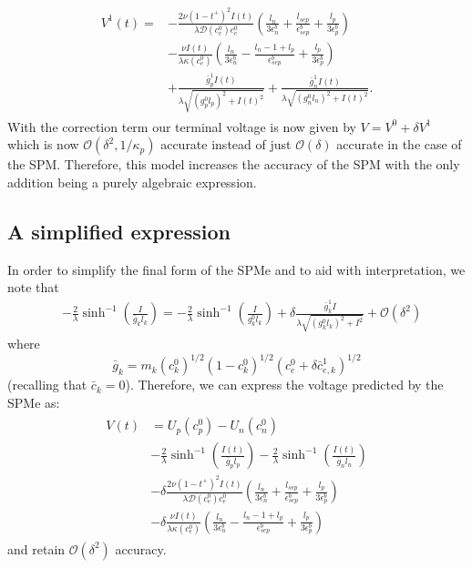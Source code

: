 \documentclass[preprint]{elsarticle}
\begin{document}
\begin{align}\label{eqn:voltageCorrection}
\begin{split} 
V^1(t) = &-\frac{2 \nu (1-t^+)^2I(t)}{\lambda \mathcal{D}(c_e^0)c_e^0}\left( \frac{l_n}{3 \epsilon_n^b} + \frac{l_{sep}}{\epsilon_{sep}^b} + \frac{l_p}{3\epsilon_p^b} \right) \\ 
    & - \frac{\nu I(t)}{\lambda \kappa(c_e^0)} \left(\frac{l_n}{3\epsilon_n^b} - \frac{l_n - 1 + l_p}{\epsilon_{sep}^b} + \frac{l_p}{3\epsilon_p^b} \right) \\
    &+ \frac{\bar{g}_p^1 I(t) }{\lambda \sqrt{(g_p^0l_p)^2+I(t)^2}} + \frac{\bar{g}_n^1 I(t) }{\lambda \sqrt{(g_n^0l_n)^2+I(t)^2}}.  
\end{split}
\end{align} 
With the correction term our terminal voltage is now given by $V=V^0+\delta V^1$ which is now $\mathcal{O}(\delta^2,1/\kappa_p)$ accurate instead of just $\mathcal{O}(\delta)$ accurate in the case of the SPM. Therefore, this model increases the accuracy of the SPM with the only addition being a purely algebraic expression. 

\subsection{A simplified expression} 
In order to simplify the final form of the SPMe and to aid with interpretation, we note that
\begin{align*} 
	&-\frac{2}{\lambda}\sinh^{-1}\left(\frac{I}{\bar{g}_k l_k}\right) = -\frac{2}{\lambda}\sinh^{-1}\left(\frac{I}{g_k^0l_k} \right)
    +\delta \frac{\bar{g}_k^1 I}{\lambda\sqrt{(g_k^0l_k)^2+I^2}} 
    + \mathcal{O}\left(\delta^2\right)
\end{align*} 
where 
\begin{equation} 
	\bar{g}_k = m_k  (c_k^0)^{1/2}(1-c_k^0)^{1/2}(c_e^0+\delta\bar{c}_{e,k}^1 )^{1/2}
\end{equation} 
(recalling that $\bar{c}_k=0$). Therefore, we can express the voltage predicted by the SPMe as: 
\begin{align}\label{eqn:simple}
\begin{split} 
V(t) &= U_p(c_p^0) - U_n(c_n^0) \\
	 & - \frac{2}{\lambda}\sinh^{-1}\left( \frac{I(t)}{\bar{g}_p l_p} \right) 
     - \frac{2}{\lambda} \sinh^{-1}\left( \frac{I(t)}{\bar{g}_n l_n} \right) \\ 
     &-\delta\frac{2 \nu (1-t^+)^2I(t)}{\lambda \mathcal{D}(c_e^0)c_e^0}\left( \frac{l_n}{3 \epsilon_n^b} + \frac{l_{sep}}{\epsilon_{sep}^b} + \frac{l_p}{3\epsilon_p^b} \right) \\ 
    & - \delta \frac{\nu I(t)}{\lambda \kappa(c_e^0)} \left(\frac{l_n}{3\epsilon_n^b} - \frac{l_n - 1 + l_p}{\epsilon_{sep}^b} + \frac{l_p}{3\epsilon_p^b} \right)
\end{split}
\end{align} 
and retain $\mathcal{O}(\delta^2)$ accuracy. 
\end{document}
